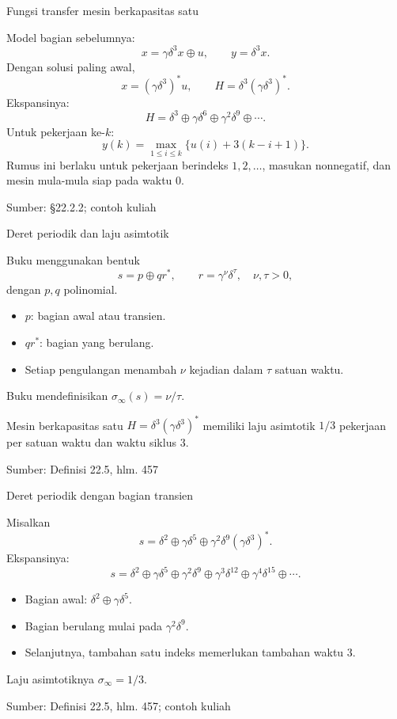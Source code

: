 \documentclass[aspectratio=169,11pt]{beamer}
\newcommand{\source}[1]{%
    \vfill
    \hfill{\tiny\color{gray}Sumber: #1}
}
\begin{document}
\begin{frame}{Fungsi transfer mesin berkapasitas satu}


Model bagian sebelumnya:
\[
x=\gamma\delta^3x\oplus u,\qquad y=\delta^3x.
\]
Dengan solusi paling awal,
\[
x=(\gamma\delta^3)^*u,\qquad
H=\delta^3(\gamma\delta^3)^*.
\]
Ekspansinya:
\[
H=\delta^3\oplus\gamma\delta^6
\oplus\gamma^2\delta^9\oplus\cdots.
\]
Untuk pekerjaan ke-$k$:
\[
y(k)=\max_{1\le i\le k}\{u(i)+3(k-i+1)\}.
\]
Rumus ini berlaku untuk pekerjaan berindeks $1,2,\ldots$,
masukan nonnegatif, dan mesin mula-mula siap pada waktu $0$.

\source{\S22.2.2; contoh kuliah}

\end{frame}
\begin{frame}{Deret periodik dan laju asimtotik}


Buku menggunakan bentuk
\[
s=p\oplus qr^*,\qquad r=\gamma^\nu\delta^\tau,\quad\nu,\tau>0,
\]
dengan $p,q$ polinomial.
\begin{itemize}
\item $p$: bagian awal atau transien.
\item $qr^*$: bagian yang berulang.
\item Setiap pengulangan menambah $\nu$ kejadian dalam $\tau$ satuan waktu.
\end{itemize}
Buku mendefinisikan $\sigma_\infty(s)=\nu/\tau$.
\begin{exampleblock}{Mesin berkapasitas satu}
$H=\delta^3(\gamma\delta^3)^*$ memiliki laju asimtotik $1/3$
pekerjaan per satuan waktu dan waktu siklus $3$.
\end{exampleblock}

\source{Definisi 22.5, hlm. 457}

\end{frame}
\begin{frame}{Deret periodik dengan bagian transien}

Misalkan
\[
s=\delta^2\oplus\gamma\delta^5
\oplus\gamma^2\delta^9(\gamma\delta^3)^*.
\]
Ekspansinya:
\[
s=\delta^2\oplus\gamma\delta^5\oplus\gamma^2\delta^9
\oplus\gamma^3\delta^{12}\oplus\gamma^4\delta^{15}\oplus\cdots.
\]
\begin{itemize}
\item Bagian awal: $\delta^2\oplus\gamma\delta^5$.
\item Bagian berulang mulai pada $\gamma^2\delta^9$.
\item Selanjutnya, tambahan satu indeks memerlukan tambahan waktu $3$.
\end{itemize}
Laju asimtotiknya $\sigma_\infty=1/3$.

\source{Definisi 22.5, hlm. 457; contoh kuliah}
\end{frame}
\end{document}
